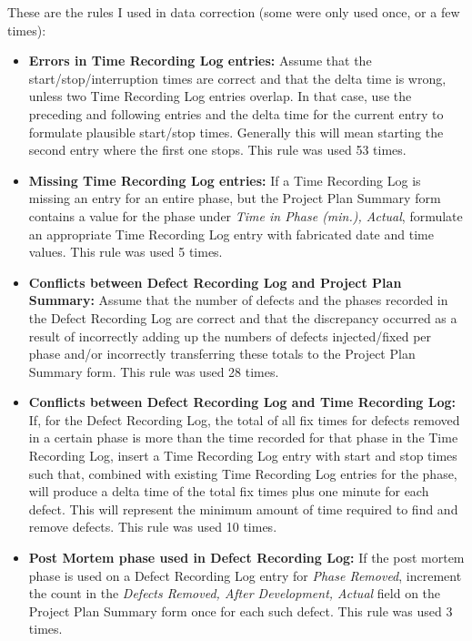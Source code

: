 These are the rules I used in data correction (some were only used once, or
a few times):

\begin{itemize}
\item {\bf Errors in Time Recording Log entries:} Assume that the
  start/stop/interruption times are correct and that the delta time is
  wrong, unless two Time Recording Log entries overlap.  In that case, use
  the preceding and following entries and the delta time for the current
  entry to formulate plausible start/stop times.  Generally this will mean
  starting the second entry where the first one stops.  This rule was used
  53 times.
  
\item {\bf Missing Time Recording Log entries:} If a Time Recording Log is
  missing an entry for an entire phase, but the Project Plan Summary form
  contains a value for the phase under {\it Time in Phase (min.), Actual},
  formulate an appropriate Time Recording Log entry with fabricated date
  and time values. This rule was used 5 times.
  
\item {\bf Conflicts between Defect Recording Log and Project Plan
    Summary:} Assume that the number of defects and the phases recorded in
  the Defect Recording Log are correct and that the discrepancy occurred as
  a result of incorrectly adding up the numbers of defects injected/fixed
  per phase and/or incorrectly transferring these totals to the Project
  Plan Summary form.  This rule was used 28 times.
  
\item {\bf Conflicts between Defect Recording Log and Time Recording Log:}
  If, for the Defect Recording Log, the total of all fix times for defects
  removed in a certain phase is more than the time recorded for that phase
  in the Time Recording Log, insert a Time Recording Log entry with start
  and stop times such that, combined with existing Time Recording Log
  entries for the phase, will produce a delta time of the total fix times
  plus one minute for each defect.  This will represent the minimum amount
  of time required to find and remove defects.  This rule was used 10
  times.

\item {\bf Post Mortem phase used in Defect Recording Log:} If the post
  mortem phase is used on a Defect Recording Log entry for {\it Phase
    Removed}, increment the count in the {\it Defects Removed, After
    Development, Actual} field on the Project Plan Summary form once for
  each such defect.  This rule was used 3 times.


\end{itemize}
